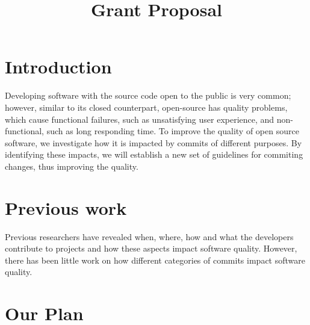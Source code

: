 \documentclass[10pt,conference]{IEEEtran}
\begin{document}
\title{Grant Proposal}

\author{
}

\maketitle


\section{Introduction}

Developing software with the source code open to the public is very common; however, similar to its closed counterpart, open-source has quality problems, which cause functional failures, such as unsatisfying user experience, and non-functional, such as long responding time.
To improve the quality of open source software, we investigate how it is impacted by commits of different purposes.
By identifying these impacts, we will establish a new set of guidelines for commiting changes, thus improving the quality.

\section{Previous work}

Previous researchers have revealed when, where, how and what the developers contribute to projects and how these aspects impact software quality. 
However, there has been little work on how different categories of commits impact software quality.

\section{Our Plan}
\end{document}
